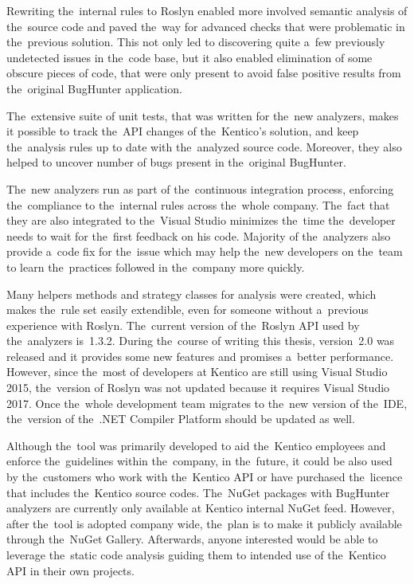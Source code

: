 \documentclass[
  digital, %
  table,   %
  lof,     %
  lot,     %
  oneside,
]{fithesis3}
\begin{document}
Rewriting the~internal rules to Roslyn enabled more involved semantic analysis of the~source code and paved the~way for advanced checks that were problematic in the~previous solution. This not only led to discovering quite a~few previously undetected issues in the~code base, but it also enabled elimination of some obscure pieces of code, that were only present to avoid false positive results from the~original BugHunter application. 

The~extensive suite of unit tests, that was written for the~new analyzers, makes it possible to track the~API changes of the~Kentico's solution, and keep the~analysis rules up to date with the~analyzed source code. Moreover, they also helped to uncover number of bugs present in the~original BugHunter.

The~new analyzers run as part of the~continuous integration process, enforcing the~compliance to the~internal rules across the~whole company. The~fact that they are also integrated to the~Visual Studio minimizes the~time the~developer needs to wait for the~first feedback on his code. Majority of the~analyzers also provide a~code fix for the~issue which may help the~new developers on the~team to learn the~practices followed in the~company more quickly.

Many helpers methods and strategy classes for analysis were created, which makes the~rule set easily extendible, even for someone without a~previous experience with Roslyn. The~current version of the~Roslyn API used by the~analyzers is~1.3.2. During the~course of writing this thesis, version~2.0 was released and it provides some new features and promises a~better performance. However, since the~most of developers at Kentico are still using Visual Studio 2015, the~version of Roslyn was not updated because it requires Visual Studio 2017. Once the~whole development team migrates to the~new version of the~IDE, the~version of the~.NET Compiler Platform should be updated as well.

Although the~tool was primarily developed to aid the~Kentico employees and enforce the~guidelines within the~company, in the~future, it could be also used by the~customers who work with the~Kentico API or have purchased the~licence that includes the~Kentico source codes. The~NuGet packages with BugHunter analyzers are currently only available at Kentico internal NuGet feed. However, after the~tool is adopted company wide, the~plan is to make it publicly available through the~NuGet Gallery. Afterwards, anyone interested would be able to leverage the~static code analysis guiding them to intended use of the~Kentico API in their own projects.
\end{document}
